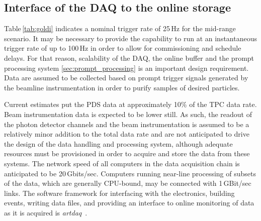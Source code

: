 \subsection{Interface of the DAQ to the online storage}
\label{sec:DAQ_online_interface}



Table\,\ref{tab:goldi} indicates a nominal trigger rate of 25\,Hz for
the mid-range scenario. It may be necessary to provide the capability
to run at  an instantaneous trigger rate of up to 100\,Hz in order to
allow for commissioning and schedule delays. For that reason,
scalability of the DAQ, the online buffer and the prompt processing system
\ref{sec:prompt_processing} is an important design requirement.
 Data are assumed to be
collected based on prompt trigger signals generated by the beamline
instrumentation in order to purify samples of desired particles.

Current estimates put the PDS data at approximately 10\% 
of the TPC data rate.  Beam instrumentation data is expected to be lower still.
As such, the readout of the photon detector channels 
 and the beam instrumentation is assumed to be a relatively minor addition to the
total data rate and are not anticipated to drive the design of the
data handling and processing system, although adequate resources must
be provisioned in order to acquire and store the data from these
systems.  The network speed of all computers in the data acquisition
chain is anticipated to be 20\,Gbits/sec. 
 Computers running near-line
processing of subsets of the data, which are generally CPU-bound, may
be connected with 1\,GBit/sec links.  The software framework for
interfacing with the electronics, building events, writing data files,
and providing an interface to online monitoring of data as it is
acquired is {\it artdaq}~\cite{artdaq}.

